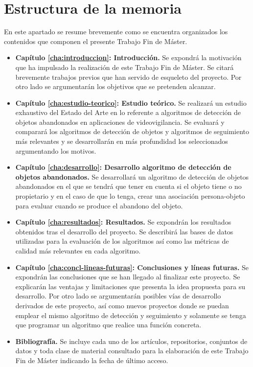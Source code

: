 \section{Estructura de la memoria}
\label{sec:estructura-memoria}
En este apartado se resume brevemente como se encuentra organizados los contenidos que componen el presente Trabajo Fin de Máster.

\begin{itemize}
    \item \textbf{Capítulo \ref{cha:introduccion}: Introducción.} Se expondrá la motivación que ha impulsado la realización de este Trabajo Fin de Máster. Se citará brevemente trabajos previos que han servido de esqueleto del proyecto. Por otro lado se argumentarán los objetivos que se pretenden alcanzar.
    \item \textbf{Capítulo \ref{cha:estudio-teorico}: Estudio teórico.} Se realizará un estudio exhaustivo del Estado del Arte en lo referente a algoritmos de detección de objetos abandonados en aplicaciones de videovigilancia. Se evaluará y comparará los algoritmos de detección de objetos y algoritmos de seguimiento más relevantes y se desarrollarán en más profundidad los seleccionados argumentando los motivos. 
    \item \textbf{Capítulo \ref{cha:desarrollo}: Desarrollo algoritmo de detección de objetos abandonados.} Se desarrollará un algoritmo de detección de objetos abandonados en el que se tendrá que tener en cuenta si el objeto tiene o no propietario y en el caso de que lo tenga, crear una asociación persona-objeto para evaluar cuando se produce el abandono del objeto.
    \item \textbf{Capítulo \ref{cha:resultados}: Resultados.} Se expondrán los resultados obtenidos tras el desarrollo del proyecto. Se describirá las bases de datos utilizadas para la evaluación de los algoritmos así como las métricas de calidad más relevantes en cada algoritmo.
    \item \textbf{Capítulo \ref{cha:concl-lineas-futuras}: Conclusiones y líneas futuras.} Se expondrán las conclusiones que se han llegado al finalizar este proyecto. Se explicarán las ventajas y limitaciones que presenta la idea propuesta para su desarrollo. Por otro lado se argumentarán posibles vías de desarrollo derivados de este proyecto, así como nuevos proyectos donde se puedan emplear el mismo algoritmo de detección y seguimiento y solamente se tenga que programar un algoritmo que realice una función concreta.
    \item \textbf{Bibliografía.} Se incluye cada uno de los artículos, repositorios, conjuntos de datos y toda clase de material consultado para la elaboración de este Trabajo Fin de Máster indicando la fecha de último acceso. 

\end{itemize}
